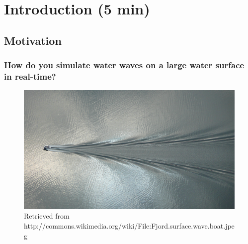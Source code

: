 \section{Introduction (5 min)}

\subsection{Motivation}

\begin{frame}
\frametitle{How do you simulate water waves on a large water surface in real-time?}

\begin{figure}
\centering
\includegraphics[width=\textwidth]{Images/Attribute/Wake/Fjord_surface_wave_boat}
\caption{Retrieved from http://commons.wikimedia.org/wiki/File:Fjord.surface.wave.boat.jpeg}
\end{figure}

\end{frame}

